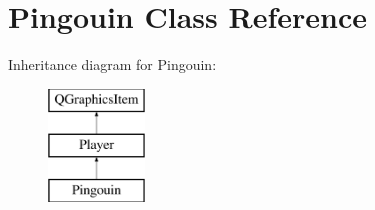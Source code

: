 \hypertarget{class_pingouin}{}\section{Pingouin Class Reference}
\label{class_pingouin}
Inheritance diagram for Pingouin\+:\begin{figure}[H]
\begin{center}
\leavevmode
\includegraphics[height=3.000000cm]{class_pingouin}
\end{center}
\end{figure}
